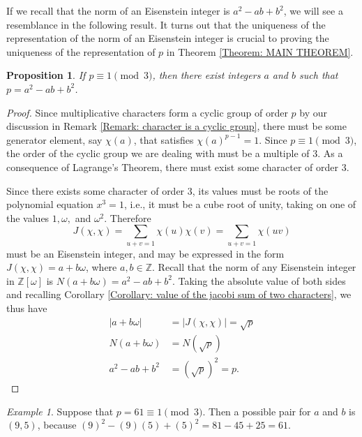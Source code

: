 \documentclass[10pt]{amsart}
\newcommand{\ZZ}{\mathbb{Z}}
\theoremstyle{plain}
\newtheorem{prop}[thm]{Proposition}
\theoremstyle{definition}
\theoremstyle{remark}
\newtheorem{ex}{Example}
\numberwithin{equation}{section}
\begin{document}
If we recall that the norm of an Eisenstein integer is $a^{2}-ab+b^{2}$, we will see a resemblance in the following result. It turns out that the uniqueness of the representation of the norm of an Eisenstein integer is crucial to proving the uniqueness of the representation of $p$ in Theorem \ref{Theorem: MAIN THEOREM}.

\begin{prop}\label{Proposition: exist integers a and b st a^2-ab+b^2}
    If $p\equiv 1\pmod{3}$, then there exist integers $a$ and $b$ such that $p=a^{2}-ab+b^{2}$. 
\end{prop}
\begin{proof}
    Since multiplicative characters form a cyclic group of order $p$ by our discussion in Remark \ref{Remark: character is a cyclic group}, there must be some generator element, say $\chi(a)$, that satisfies $\chi(a)^{p-1}=1$. Since $p\equiv 1\pmod{3}$, the order of the cyclic group we are dealing with must be a multiple of $3$. As a consequence of Lagrange's Theorem, there must exist some character of order $3$. 

    \indent Since there exists some character of order $3$, its values must be roots of the polynomial equation $x^{3}=1$, i.e., it must be a cube root of unity, taking on one of the values $1,\omega,$ and $\omega^{2}$. Therefore 
    \begin{equation*}
        J(\chi,\chi) = \sum_{u+v=1}\chi(u)\chi(v) = \sum_{u+v=1}\chi(uv)
    \end{equation*}
    must be an Eisenstein integer, and may be expressed in the form $J(\chi,\chi) = a+b\omega$, where $a,b\in\ZZ$. Recall that the norm of any Eisenstein integer in $\ZZ[\omega]$ is $N(a+b\omega) = a^{2}-ab+b^{2}$. Taking the absolute value of both sides and recalling Corollary \ref{Corollary: value of the jacobi sum of two characters}, we thus have
    \begin{align*}
        |a+b\omega| & = |J(\chi,\chi)| = \sqrt{p} \\
        N(a+b\omega) & = N(\sqrt{p}) \\
        a^{2}-ab+b^{2} & = (\sqrt{p})^{2} = p.
    \end{align*}
\end{proof}

\begin{ex}
    Suppose that $p=61\equiv 1\pmod{3}$. Then a possible pair for $a$ and $b$ is $(9,5)$, because $(9)^{2}-(9)(5)+(5)^{2} = 81-45+25 = 61$. 
\end{ex}
\end{document}
